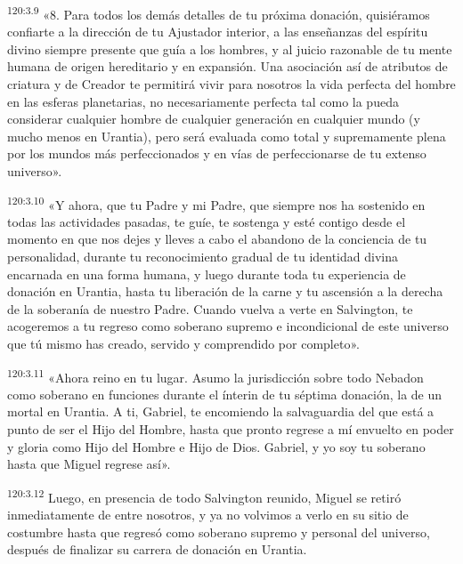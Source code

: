\par
\textsuperscript{120:3.9} «8. Para todos los demás detalles de tu próxima donación, quisiéramos confiarte a la dirección de tu Ajustador interior, a las enseñanzas del espíritu divino siempre presente que guía a los hombres, y al juicio razonable de tu mente humana de origen hereditario y en expansión. Una asociación así de atributos de criatura y de Creador te permitirá vivir para nosotros la vida perfecta del hombre en las esferas planetarias, no necesariamente perfecta tal como la pueda considerar cualquier hombre de cualquier generación en cualquier mundo (y mucho menos en Urantia), pero será evaluada como total y supremamente plena por los mundos más perfeccionados y en vías de perfeccionarse de tu extenso universo».

\par
\textsuperscript{120:3.10} «Y ahora, que tu Padre y mi Padre, que siempre nos ha sostenido en todas las actividades pasadas, te guíe, te sostenga y esté contigo desde el momento en que nos dejes y lleves a cabo el abandono de la conciencia de tu personalidad, durante tu reconocimiento gradual de tu identidad divina encarnada en una forma humana, y luego durante toda tu experiencia de donación en Urantia, hasta tu liberación de la carne y tu ascensión a la derecha de la soberanía de nuestro Padre. Cuando vuelva a verte en Salvington, te acogeremos a tu regreso como soberano supremo e incondicional de este universo que tú mismo has creado, servido y comprendido por completo».

\par
\textsuperscript{120:3.11} «Ahora reino en tu lugar. Asumo la jurisdicción sobre todo Nebadon como soberano en funciones durante el ínterin de tu séptima donación, la de un mortal en Urantia. A ti, Gabriel, te encomiendo la salvaguardia del que está a punto de ser el Hijo del Hombre, hasta que pronto regrese a mí envuelto en poder y gloria como Hijo del Hombre e Hijo de Dios. Gabriel, y yo soy tu soberano hasta que Miguel regrese así».

\par
\textsuperscript{120:3.12} Luego, en presencia de todo Salvington reunido, Miguel se retiró inmediatamente de entre nosotros, y ya no volvimos a verlo en su sitio de costumbre hasta que regresó como soberano supremo y personal del universo, después de finalizar su carrera de donación en Urantia.

